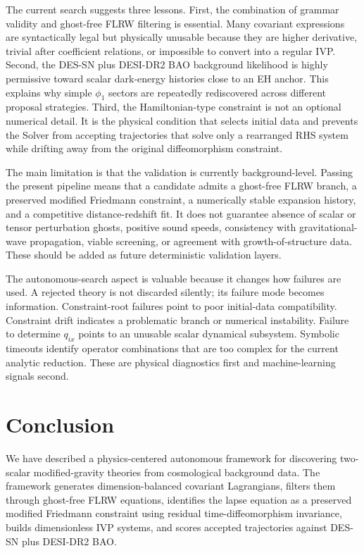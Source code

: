 \documentclass[aps,prd,twocolumn,superscriptaddress,nofootinbib,longbibliography]{revtex4-2}
\begin{document}
The current search suggests three lessons.  First, the combination of grammar validity and ghost-free FLRW filtering is essential.  Many covariant expressions are syntactically legal but physically unusable because they are higher derivative, trivial after coefficient relations, or impossible to convert into a regular IVP.  Second, the DES-SN plus DESI-DR2 BAO background likelihood is highly permissive toward scalar dark-energy histories close to an EH anchor.  This explains why simple $\phi_1$ sectors are repeatedly rediscovered across different proposal strategies.  Third, the Hamiltonian-type constraint is not an optional numerical detail.  It is the physical condition that selects initial data and prevents the Solver from accepting trajectories that solve only a rearranged RHS system while drifting away from the original diffeomorphism constraint.

The main limitation is that the validation is currently background-level.  Passing the present pipeline means that a candidate admits a ghost-free FLRW branch, a preserved modified Friedmann constraint, a numerically stable expansion history, and a competitive distance-redshift fit.  It does not guarantee absence of scalar or tensor perturbation ghosts, positive sound speeds, consistency with gravitational-wave propagation, viable screening, or agreement with growth-of-structure data.  These should be added as future deterministic validation layers.

The autonomous-search aspect is valuable because it changes how failures are used.  A rejected theory is not discarded silently; its failure mode becomes information.  Constraint-root failures point to poor initial-data compatibility.  Constraint drift indicates a problematic branch or numerical instability.  Failure to determine $q_{ix}$ points to an unusable scalar dynamical subsystem.  Symbolic timeouts identify operator combinations that are too complex for the current analytic reduction.  These are physical diagnostics first and machine-learning signals second.

\section{Conclusion}
\label{sec:conclusion}

We have described a physics-centered autonomous framework for discovering two-scalar modified-gravity theories from cosmological background data.  The framework generates dimension-balanced covariant Lagrangians, filters them through ghost-free FLRW equations, identifies the lapse equation as a preserved modified Friedmann constraint using residual time-diffeomorphism invariance, builds dimensionless IVP systems, and scores accepted trajectories against DES-SN plus DESI-DR2 BAO.
\end{document}
